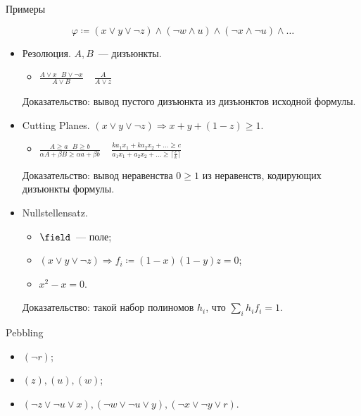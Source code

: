 \begin{frame}{Примеры}

    $$
        \varphi \coloneqq (x \lor y \lor \neg z) \land (\neg w \land u) \land (\neg x \land \neg u) \land \dots
    $$

    \pause
    \begin{itemize}
        \item Резолюция. $A, B$~--- дизъюнкты.
            \begin{itemize}
                \item $\frac{A \lor x ~~~ B \lor \neg x}{A \lor B} ~~~~~ \frac{A}{A \lor z}$
            \end{itemize}
            Доказательство: вывод пустого дизъюнкта из дизъюнктов исходной формулы.
        \pause
        \item Cutting Planes. $(x \lor y \lor \neg z) \Rightarrow x + y + (1 - z) \ge 1$.
            \begin{itemize}
                \item $\frac{A \ge a ~~~ B \ge b}{\alpha A + \beta B \ge \alpha a + \beta b} ~~~~~
                    \frac{ka_1 x_1 + ka_2 x_2 + \dots \ge c}{a_1 x_1 + a_2 x_2 + \dots \ge \lceil
                    \frac{c}{k} \rceil}$
            \end{itemize}
            Доказательство: вывод неравенства $0 \ge 1$ из неравенств, кодирующих дизъюнкты формулы.
        \pause
        \item Nullstellensatz.
            \begin{itemize}
                \item $\field$~--- поле;
                \item $(x \lor y \lor \neg z) \Rightarrow f_i \coloneqq (1 - x) (1 - y) z = 0$;
                \item $x^2 - x = 0$.
            \end{itemize}
            Доказательство: такой набор полиномов $h_i$, что $\sum\limits_{i} h_i f_i = 1$.
    \end{itemize}

\end{frame}


\begin{frame}{Pebbling}

    \begin{center}
                
    \end{center}

    \pause
    \begin{itemize}
        \item $(\neg r)$;
            \pause
        \item $(z), (u), (w)$;
            \pause
        \item $(\neg z \lor \neg u \lor x), (\neg w \lor \neg u \lor y), (\neg x \lor \neg y \lor r)$.
    \end{itemize}

    \pause
    
\end{frame}

